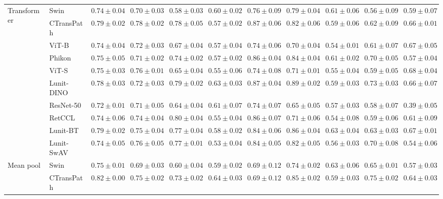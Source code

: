 \begin{tabular}{ll|cccc|c|cccc}
\cline{1-11}
\multirow[t]{10}{*}{Transformer} & Swin & $0.74 \pm 0.04$ & $0.70 \pm 0.03$ & $0.58 \pm 0.03$ & $0.60 \pm 0.02$ & $0.76 \pm 0.09$ & $0.79 \pm 0.04$ & $0.61 \pm 0.06$ & $0.56 \pm 0.09$ & $0.59 \pm 0.07$ \\
 & CTransPath & $\mathbf{0.79 \pm 0.02}$ & $\mathbf{0.78 \pm 0.02}$ & $0.78 \pm 0.05$ & $0.57 \pm 0.02$ & $0.87 \pm 0.06$ & $0.82 \pm 0.06$ & $0.59 \pm 0.06$ & $0.62 \pm 0.09$ & $0.66 \pm 0.01$ \\
 & ViT-B & $0.74 \pm 0.04$ & $0.72 \pm 0.03$ & $0.67 \pm 0.04$ & $0.57 \pm 0.04$ & $0.74 \pm 0.06$ & $0.70 \pm 0.04$ & $0.54 \pm 0.01$ & $0.61 \pm 0.07$ & $0.67 \pm 0.05$ \\
 & Phikon & $0.75 \pm 0.05$ & $0.71 \pm 0.02$ & $0.74 \pm 0.02$ & $0.57 \pm 0.02$ & $0.86 \pm 0.04$ & $0.84 \pm 0.04$ & $0.61 \pm 0.02$ & $0.70 \pm 0.05$ & $0.57 \pm 0.04$ \\
 & ViT-S & $0.75 \pm 0.03$ & $0.76 \pm 0.01$ & $0.65 \pm 0.04$ & $0.55 \pm 0.06$ & $0.74 \pm 0.08$ & $0.71 \pm 0.01$ & $0.55 \pm 0.04$ & $0.59 \pm 0.05$ & $\mathbf{0.68 \pm 0.04}$ \\
 & Lunit-DINO & $0.78 \pm 0.03$ & $0.72 \pm 0.03$ & $0.79 \pm 0.02$ & $\mathbf{0.63 \pm 0.03}$ & $\mathbf{0.87 \pm 0.04}$ & $\mathbf{0.89 \pm 0.02}$ & $0.59 \pm 0.03$ & $\mathbf{0.73 \pm 0.03}$ & $0.66 \pm 0.07$ \\
 & ResNet-50 & $0.72 \pm 0.01$ & $0.71 \pm 0.05$ & $0.64 \pm 0.04$ & $0.61 \pm 0.07$ & $0.74 \pm 0.07$ & $0.65 \pm 0.05$ & $0.57 \pm 0.03$ & $0.58 \pm 0.07$ & $0.39 \pm 0.05$ \\
 & RetCCL & $0.74 \pm 0.06$ & $0.74 \pm 0.04$ & $\mathbf{0.80 \pm 0.04}$ & $0.55 \pm 0.04$ & $0.86 \pm 0.07$ & $0.71 \pm 0.06$ & $0.54 \pm 0.08$ & $0.59 \pm 0.06$ & $0.61 \pm 0.09$ \\
 & Lunit-BT & $0.79 \pm 0.02$ & $0.75 \pm 0.04$ & $0.77 \pm 0.04$ & $0.58 \pm 0.02$ & $0.84 \pm 0.06$ & $0.86 \pm 0.04$ & $\mathbf{0.63 \pm 0.04}$ & $0.63 \pm 0.03$ & $0.67 \pm 0.01$ \\
 & Lunit-SwAV & $0.74 \pm 0.05$ & $0.76 \pm 0.05$ & $0.77 \pm 0.01$ & $0.53 \pm 0.04$ & $0.84 \pm 0.05$ & $0.82 \pm 0.05$ & $0.56 \pm 0.03$ & $0.70 \pm 0.08$ & $0.54 \pm 0.06$ \\
\cline{1-11}
\multirow[t]{10}{*}{Mean pool} & Swin & $0.75 \pm 0.01$ & $0.69 \pm 0.03$ & $0.60 \pm 0.04$ & $0.59 \pm 0.02$ & $0.69 \pm 0.12$ & $0.74 \pm 0.02$ & $0.63 \pm 0.06$ & $0.65 \pm 0.01$ & $0.57 \pm 0.03$ \\
 & CTransPath & $\mathbf{0.82 \pm 0.00}$ & $0.75 \pm 0.02$ & $0.73 \pm 0.02$ & $\mathbf{0.64 \pm 0.03}$ & $0.69 \pm 0.12$ & $0.85 \pm 0.02$ & $0.59 \pm 0.03$ & $0.75 \pm 0.02$ & $0.64 \pm 0.03$ \\

\end{tabular}

